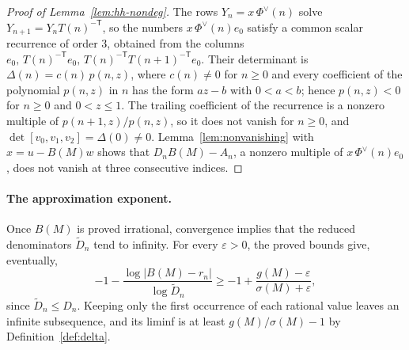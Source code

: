 \documentclass[oneside,english,11pt]{amsart}
\begin{document}

\begin{proof}[Proof of Lemma~\ref{lem:hh-nondeg}]
The rows $Y_n=x\,\Phi^\vee(n)$ solve $Y_{n+1}=Y_nT(n)^{-\mathsf T}$, so the numbers $x\,\Phi^\vee(n)e_0$ satisfy a common scalar recurrence of order $3$, obtained from the columns $e_0,\,T(n)^{-\mathsf T}e_0,\,T(n)^{-\mathsf T}T(n+1)^{-\mathsf T}e_0$. Their determinant is $\Delta(n)=c(n)\,p(n,z)$, where $c(n)\ne0$ for $n\ge0$ and every coefficient of the polynomial $p(n,z)$ in $n$ has the form $a z-b$ with $0<a<b$; hence $p(n,z)<0$ for $n\ge0$ and $0<z\le1$. The trailing coefficient of the recurrence is a nonzero multiple of $p(n+1,z)/p(n,z)$, so it does not vanish for $n\ge0$, and $\det[v_0,v_1,v_2]=\Delta(0)\ne0$. Lemma~\ref{lem:nonvanishing} with $x=u-B(M)w$ shows that $D_nB(M)-A_n$, a nonzero multiple of $x\,\Phi^\vee(n)e_0$, does not vanish at three consecutive indices.
\end{proof}

\paragraph{The approximation exponent.}
Once $B(M)$ is proved irrational, convergence implies that the reduced denominators $\widetilde D_n$ tend to infinity.
For every $\varepsilon>0$, the proved bounds give, eventually,
\[
 -1-\frac{\log|B(M)-r_n|}{\log\widetilde D_n}
 \ge -1+\frac{g(M)-\varepsilon}{\sigma(M)+\varepsilon},
\]
since $\widetilde D_n\le D_n$. Keeping only the first occurrence of each rational value leaves an infinite subsequence,
and its liminf is at least $g(M)/\sigma(M)-1$ by Definition~\ref{def:delta}. 
\end{document}
